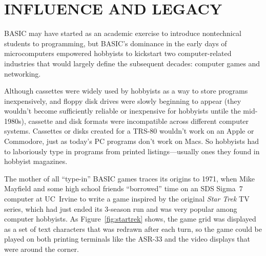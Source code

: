 


\section{INFLUENCE AND LEGACY}



BASIC may have started as an academic exercise to introduce
nontechnical students to programming, but BASIC's dominance in the
early days of microcomputers empowered hobbyists to kickstart two
computer-related industries that would largely define the subsequent
decades: computer games and networking.

Although cassettes were widely used by hobbyists as a way to store
programs inexpensively, and floppy disk drives were slowly beginning
to appear (they wouldn't become sufficiently reliable or inexpensive
for hobbyists untile the mid-1980s), cassette and disk formats were incompatible across
different computer systems.
Cassettes or disks created for a TRS-80 wouldn't work on an Apple or
Commodore, just as today's PC programs don't work on Macs.
So hobbyists had to laboriously type in programs from printed
listings---usually ones they found
in hobbyist magazines.

The mother of all ``type-in'' BASIC games
traces its origins to 1971,
when Mike Mayfield and some high school friends ``borrowed'' time on
an SDS Sigma~7 computer at UC~Irvine to write a game inspired by the
original \emph{Star Trek} TV series, which had just ended its 3-season
run and was very popular among computer hobbyists.
As Figure~\ref{fig:startrek} shows, the game grid was displayed as a
set of text characters that was redrawn 
after each turn, so the game could be played on both printing
terminals like the ASR-33 and the video displays that were around
the corner.

